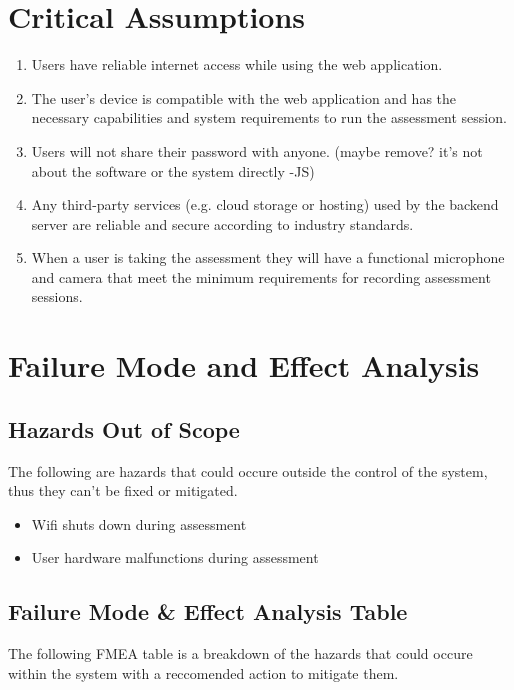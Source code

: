 \documentclass{article}
\begin{document}
\section{Critical Assumptions}
\begin{enumerate}
    \item Users have reliable internet access while using the web application.
    \item The user's device is compatible with the web application and has the necessary capabilities and system requirements to run the assessment session.
    \item Users will not share their password with anyone. (maybe remove? it's not about the software or the system directly -JS)
    \item Any third-party services (e.g. cloud storage or hosting) used by the backend server are reliable and secure according to industry standards.
    \item When a user is taking the assessment they will have a functional microphone and camera that meet the minimum requirements for recording assessment sessions.
\end{enumerate}

\section{Failure Mode and Effect Analysis}
\subsection{Hazards Out of Scope}
The following are hazards that could occure outside the control of the system, thus they can't be fixed or mitigated.
\begin{itemize}
    \item Wifi shuts down during assessment
    \item User hardware malfunctions during assessment
\end{itemize}
\subsection{Failure Mode \& Effect Analysis Table}
The following FMEA table is a breakdown of the hazards that could occure within the system with a reccomended action to mitigate them.
\end{document}
